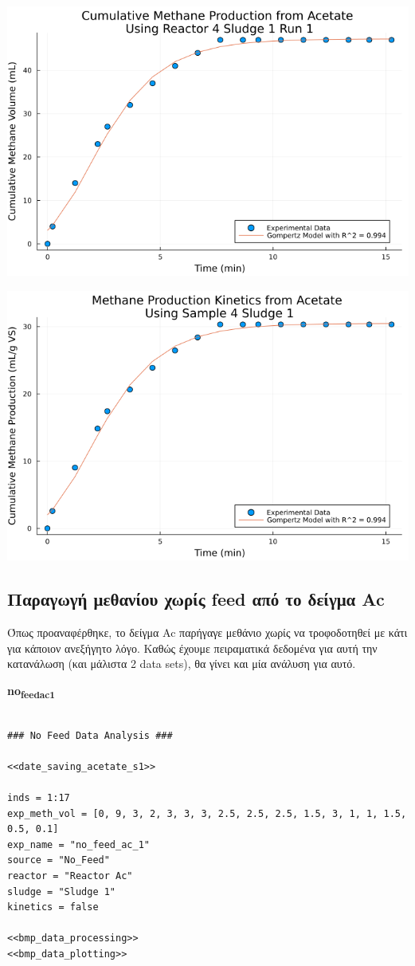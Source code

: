 \documentclass[11pt]{article}
\begin{document}
\begin{center}
\includegraphics[width=.9\linewidth]{../plots/BMPs/Acetate/methane_kinetics_acet_test_4_s1_min.png}
\end{center}

\begin{center}
\includegraphics[width=.9\linewidth]{../plots/BMPs/Acetate/specific_methane_kinetics_acet_test_4_s1.png}
\end{center}

\subsection{Παραγωγή μεθανίου χωρίς feed από το δείγμα Ac}
\label{sec:orgbec1718}
Όπως προαναφέρθηκε, το δείγμα Ac παρήγαγε μεθάνιο χωρίς να τροφοδοτηθεί με κάτι για κάποιον ανεξήγητο λόγο. Καθώς έχουμε πειραματικά δεδομένα για αυτή την κατανάλωση (και μάλιστα 2 data sets), θα γίνει και μία ανάλυση για αυτό.

\textbf{no\textsubscript{feed}\textsubscript{ac}\textsubscript{1}}
\begin{verbatim}

### No Feed Data Analysis ###

<<date_saving_acetate_s1>>

inds = 1:17
exp_meth_vol = [0, 9, 3, 2, 3, 3, 3, 2.5, 2.5, 2.5, 1.5, 3, 1, 1, 1.5, 0.5, 0.1]
exp_name = "no_feed_ac_1"
source = "No_Feed"
reactor = "Reactor Ac"
sludge = "Sludge 1"
kinetics = false

<<bmp_data_processing>>
<<bmp_data_plotting>>
\end{verbatim}
\end{document}
